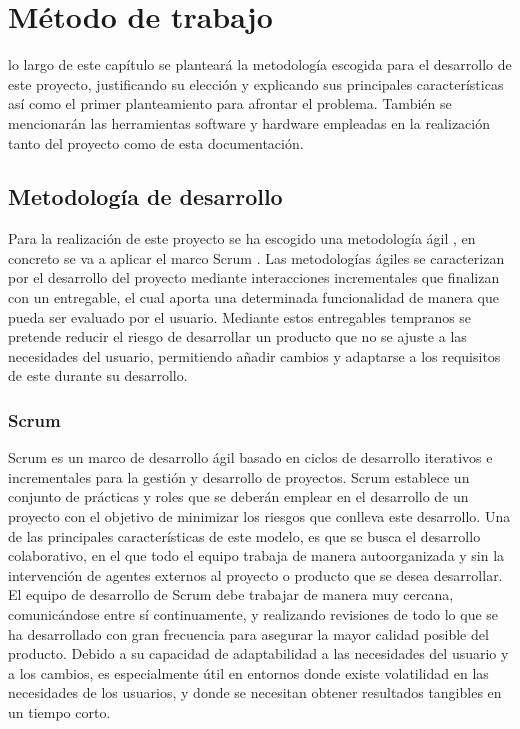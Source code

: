 \chapter{Método de trabajo}
\label{chap:metodo}

\noindent
{} lo largo de este capítulo se planteará la metodología escogida para el desarrollo de este proyecto, justificando su elección y explicando sus principales características así como el  primer planteamiento para afrontar el problema. También se mencionarán las herramientas software y hardware empleadas en la realización tanto del proyecto como de esta documentación.


\section{Metodología de desarrollo}

Para la realización de este proyecto se ha escogido una metodología ágil \cite{ilieva2004analyses}, en concreto se va a aplicar el marco Scrum \cite{schwaber2004agile}. Las metodologías ágiles se caracterizan por el desarrollo del proyecto mediante interacciones incrementales que finalizan con un entregable, el cual aporta una determinada funcionalidad de manera que pueda ser evaluado por el usuario. Mediante estos entregables tempranos se pretende reducir el riesgo de desarrollar un producto que no se ajuste a las necesidades del usuario, permitiendo añadir cambios y adaptarse a los requisitos de este durante su desarrollo.

\subsection{Scrum}

Scrum es un marco de desarrollo ágil basado en ciclos de desarrollo iterativos e incrementales para la gestión y desarrollo de proyectos. Scrum establece un conjunto de prácticas y roles que se deberán emplear en el desarrollo de un proyecto con el objetivo de minimizar los riesgos que conlleva este desarrollo. Una de las principales características de este modelo, es que se busca el desarrollo colaborativo, en el que todo el equipo trabaja de manera autoorganizada y sin la intervención de agentes externos al proyecto o producto que se desea desarrollar. El equipo de desarrollo de Scrum debe trabajar de manera muy cercana, comunicándose entre sí continuamente, y realizando revisiones de todo lo que se ha desarrollado con gran frecuencia para asegurar la mayor calidad posible del producto. Debido a su capacidad de adaptabilidad a las necesidades del usuario y a los cambios, es especialmente útil en entornos donde existe volatilidad en las necesidades de los usuarios, y donde se necesitan obtener resultados tangibles en un tiempo corto. 

